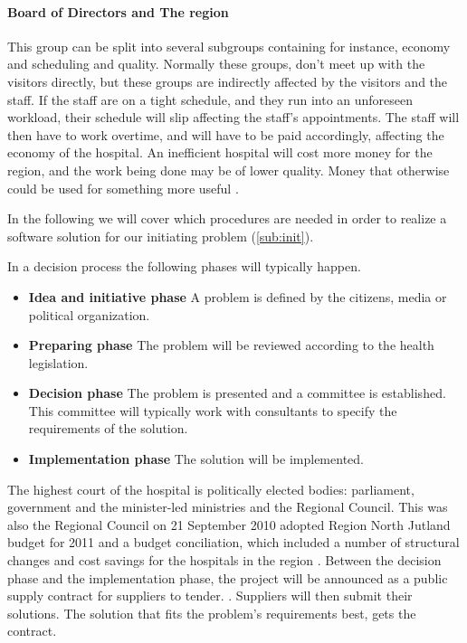 \paragraph{Board of Directors and The region}
This group can be split into several subgroups containing for instance, economy and scheduling and quality. Normally these groups, don't meet up with the visitors directly, but these groups are indirectly affected by the visitors and the staff. If the staff are on a tight schedule, and they run into an unforeseen workload, their schedule will slip affecting the staff's appointments. The staff will then have to work overtime, and  will have to be paid accordingly, affecting the economy of the hospital. An inefficient hospital will cost more money for the region, and the work being done may be of lower quality. Money that otherwise could be used for something more useful \cite{timer_til_at_hjelpe_rundt}.

In the following we will cover which procedures are needed in order to realize a software solution for our initiating problem (\cref{sub:init}).

In a decision process the following phases will typically happen. \cite{Sjaelland}


\begin{itemize}
  \setlength{\itemsep}{1pt}
  \setlength{\parskip}{0pt}
  \setlength{\parsep}{0pt}
	\item \textbf{Idea and initiative phase} A problem is defined by the citizens, media or political organization.
	\item \textbf{Preparing phase} The problem will be reviewed according to the health legislation.
	\item \textbf{Decision phase} The problem is presented and a committee is established. This committee will typically work with consultants to specify the requirements of the solution.
	\item \textbf{Implementation phase} The solution will be implemented. 
\end{itemize}

The highest court of the hospital is politically elected bodies: parliament, government and the minister-led ministries and the Regional Council. This was also the Regional Council on 21 September 2010 adopted Region North Jutland budget for 2011 and a budget conciliation, which included a number of structural changes and cost savings for the hospitals in the region \cite{politisk_styret_ca}. Between the decision phase and the implementation phase, the project will be announced as a public supply contract for suppliers to tender. \cite{Union2004}. Suppliers will then submit their solutions. The solution that fits the problem's requirements best, gets the contract. 